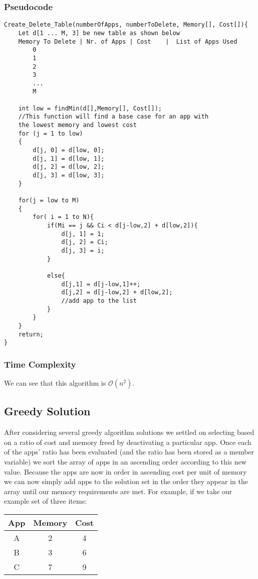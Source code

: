 \documentclass{article}
\begin{document}
\subsubsection{Pseudocode}
\begin{lstlisting}[mathescape]
Create_Delete_Table(numberOfApps, numberToDelete, Memory[], Cost[]){
	Let d[1 ... M, 3] be new table as shown below
	Memory To Delete | Nr. of Apps | Cost    |  List of Apps Used
		0
		1
		2
		3
		...
		M

	int low = findMin(d[],Memory[], Cost[]);
    //This function will find a base case for an app with
    the lowest memory and lowest cost
	for (j = 1 to low)
	{
		d[j, 0] = d[low, 0];
		d[j, 1] = d[low, 1];
		d[j, 2] = d[low, 2];
		d[j, 3] = d[low, 3];
	}

	for(j = low to M)
	{
		for( i = 1 to N){
			if(Mi == j && Ci < d[j-low,2] + d[low,2]){
				d[j, 1] = 1;
				d[j, 2] = Ci;
				d[j, 3] = i;
			}

			else{
				d[j,1] = d[j-low,1]++;
				d[j,2] = d[j-low,2] + d[low,2];
				//add app to the list
			}
		}
	}
	return;
}
\end{lstlisting}

\subsubsection{Time Complexity}
We can see that this algorithm is $\mathcal{O}(n^2)$.

\subsection{Greedy Solution}
After considering several greedy algorithm solutions we settled on selecting based on a ratio of cost and memory freed by deactivating a particular app. Once each of the apps’ ratio has been evaluated (and the ratio has been stored as a member variable) we sort the array of apps in an ascending order according to this new value. Because the apps are now in order in ascending cost per unit of memory we can now simply add apps to the solution set in the order they appear in the array until our memory requirements are met. For example, if we take our example set of three items:

\begin{center}
    \begin{tabular}{|c|c|c|}
        \hline
        App & Memory & Cost \\ \hline
        A & 2 & 4 \\
        B & 3 & 6 \\
        C & 7 & 9 \\
        \hline
    \end{tabular}
\end{center}
\end{document}
